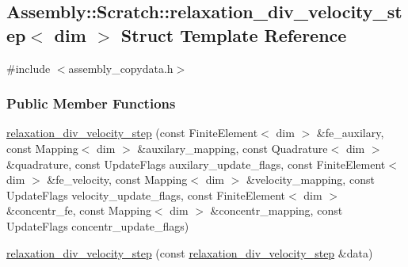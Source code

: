 \hypertarget{struct_assembly_1_1_scratch_1_1relaxation__div__velocity__step}{}\subsection{Assembly\+:\+:Scratch\+:\+:relaxation\+\_\+div\+\_\+velocity\+\_\+step$<$ dim $>$ Struct Template Reference}
\label{struct_assembly_1_1_scratch_1_1relaxation__div__velocity__step}


{\ttfamily \#include $<$assembly\+\_\+copydata.\+h$>$}

\subsubsection*{Public Member Functions}
\begin{DoxyCompactItemize}
\item 
\hyperlink{struct_assembly_1_1_scratch_1_1relaxation__div__velocity__step_ac3a5853ca83d9a9c1b5f9a14792369eb}{relaxation\+\_\+div\+\_\+velocity\+\_\+step} (const Finite\+Element$<$ dim $>$ \&fe\+\_\+auxilary, const Mapping$<$ dim $>$ \&auxilary\+\_\+mapping, const Quadrature$<$ dim $>$ \&quadrature, const Update\+Flags auxilary\+\_\+update\+\_\+flags, const Finite\+Element$<$ dim $>$ \&fe\+\_\+velocity, const Mapping$<$ dim $>$ \&velocity\+\_\+mapping, const Update\+Flags velocity\+\_\+update\+\_\+flags, const Finite\+Element$<$ dim $>$ \&concentr\+\_\+fe, const Mapping$<$ dim $>$ \&concentr\+\_\+mapping, const Update\+Flags concentr\+\_\+update\+\_\+flags)
\item 
\hyperlink{struct_assembly_1_1_scratch_1_1relaxation__div__velocity__step_a5386826f18101deb13e7651062637a85}{relaxation\+\_\+div\+\_\+velocity\+\_\+step} (const \hyperlink{struct_assembly_1_1_scratch_1_1relaxation__div__velocity__step}{relaxation\+\_\+div\+\_\+velocity\+\_\+step} \&data)
\end{DoxyCompactItemize}
